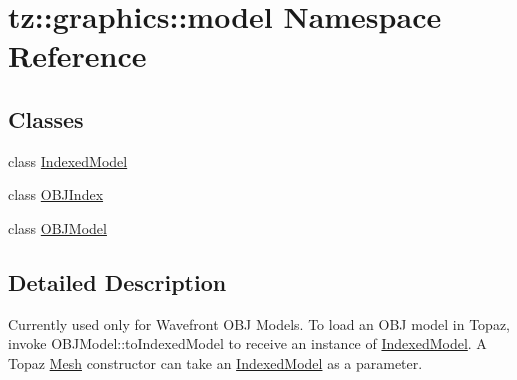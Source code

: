 \hypertarget{namespacetz_1_1graphics_1_1model}{}\section{tz\+:\+:graphics\+:\+:model Namespace Reference}
\label{namespacetz_1_1graphics_1_1model}
\subsection*{Classes}
\begin{DoxyCompactItemize}
\item 
class \mbox{\hyperlink{classtz_1_1graphics_1_1model_1_1_indexed_model}{Indexed\+Model}}
\item 
class \mbox{\hyperlink{classtz_1_1graphics_1_1model_1_1_o_b_j_index}{O\+B\+J\+Index}}
\item 
class \mbox{\hyperlink{classtz_1_1graphics_1_1model_1_1_o_b_j_model}{O\+B\+J\+Model}}
\end{DoxyCompactItemize}


\subsection{Detailed Description}
Currently used only for Wavefront O\+BJ Models. To load an O\+BJ model in Topaz, invoke O\+B\+J\+Model\+::to\+Indexed\+Model to receive an instance of \mbox{\hyperlink{classtz_1_1graphics_1_1model_1_1_indexed_model}{Indexed\+Model}}. A Topaz \mbox{\hyperlink{class_mesh}{Mesh}} constructor can take an \mbox{\hyperlink{classtz_1_1graphics_1_1model_1_1_indexed_model}{Indexed\+Model}} as a parameter. 